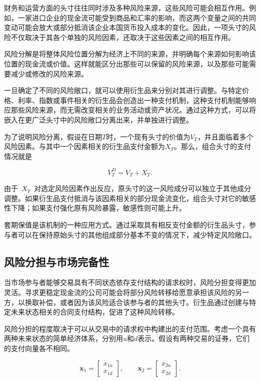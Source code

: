 财务和运营方面的头寸往往同时涉及多种风险来源，这些风险可能会相互作用。例如，一家进口企业的现金流可能受到商品和汇率的影响，而这两个变量之间的共同变动可能会放大或部分抵消该企业本国货币投入成本的变化。因此，一项头寸的风险不仅取决于其各个单独的风险因素，还取决于这些因素之间的相互作用。

风险分解是将整体风险位置分解为经济上不同的来源，并明确每个来源如何影响该位置的现金流或价值。这样就能区分出那些可以保留的风险来源，以及那些可能需要减少或修改的风险来源。

一旦确定了不同的风险敞口，就可以使用衍生品来分别对其进行调整。与特定价格、利率、指数或事件相关的衍生品会创造出一种支付机制，这种支付机制能够响应那些风险来源，而无需改变相关的业务活动或资产状况。通过这种方式，可以将嵌入在更广泛头寸中的风险敞口分离出来，并单独进行调整。

为了说明风险分离，假设在日期$T$时，一个现有头寸的价值为$V_T$，并且面临着多个风险因素。与其中一个因素相关的衍生品支付金额为$X_T$。那么，组合头寸的支付情况就是

\begin{equation}
V_T^{D}=V_T+X_T.
\label{eq:ch11-combined-derivative-position}
\end{equation}

由于~$X_T$~对选定风险因素作出反应，原头寸的这一风险成分可以独立于其他成分调整。如果衍生品支付抵消与该因素相关的部分现金流变化，组合头寸对它的敏感性下降；如果支付强化原有风险暴露，敏感性则可能上升。

套期保值是该机制的一种应用方式。通过采取具有相反支付金额的衍生品头寸，参与者可以在保持原始头寸的其他组成部分基本不变的情况下，减少特定风险敞口。

\subsection{风险分担与市场完备性}

当市场参与者能够交易具有不同状态依存支付结构的请求权时，风险分担变得更加灵活。寻求更稳定现金流的公司可能会将部分风险转移给愿意承担该风险的另一方，以换取补偿，或者因为该风险适合该参与者的其他头寸。衍生品通过创建与特定未来状态相关的合同支付结构，促进了这种风险转移。

风险分担的程度取决于可以从交易中的请求权中构建出的支付范围。考虑一个具有两种未来状态的简单经济体系，分别用$u$和$d$表示。假设有两种交易的证券，它们的支付向量各不相同。

\begin{equation}
\mathbf{x}_1=
\begin{bmatrix}
x_{1u}\\
x_{1d}                                                      
\end{bmatrix},
\qquad
\mathbf{x}_2=
\begin{bmatrix}
x_{2u}\\
x_{2d}
\end{bmatrix}.
\label{eq:ch11-two-security-payoffs}
\end{equation}

